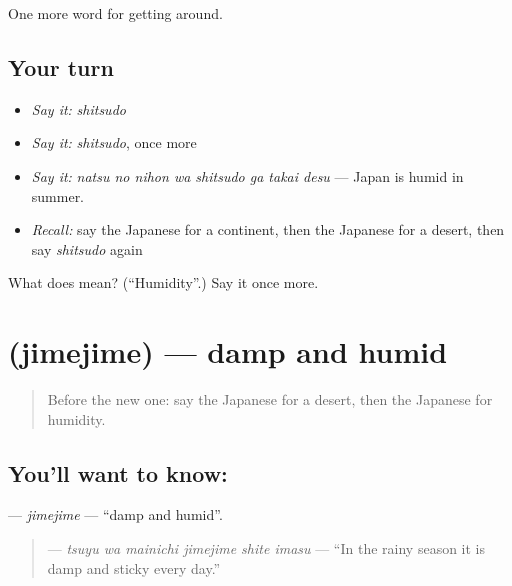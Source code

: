 \begin{grammarlens}[title={What you've built}]
One more word for getting around.
\end{grammarlens}

\subsection*{Your turn}
\begin{itemize}
\raggedright
  \item \emph{Say it:} \emph{shitsudo}
  \item \emph{Say it:} \emph{shitsudo}, once more
  \item \emph{Say it:} \emph{natsu no nihon wa shitsudo ga takai desu} — Japan is humid in summer.
  \item \emph{Recall:} say the Japanese for a continent, then the Japanese for a desert, then say \emph{shitsudo} again
\end{itemize}

\begin{tcolorbox}[breakable,colback=teal!4,colframe=teal!35!black,title={Before you move on}]
What does  mean? (\textquotedblleft{}Humidity\textquotedblright{}.) Say it once more.
\end{tcolorbox}
\section[\texorpdfstring{\ja{じめじめ} (jimejime)}{じめじめ (jimejime)}]{ (jimejime) — damp and humid}

\label{lesson:JA-C414-jimejime}



\begin{quote}
Before the new one: say the Japanese for a desert, then the Japanese for humidity.
\end{quote}

\subsection*{You'll want to know: }
\textbf{} — \emph{jimejime} — \textquotedblleft{}damp and humid\textquotedblright{}.

\begin{quote}
\textbf{  } — \emph{tsuyu wa mainichi jimejime shite imasu} — \textquotedblleft{}In the rainy season it is damp and sticky every day.\textquotedblright{}
\end{quote}

